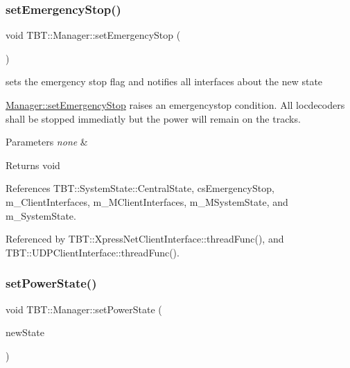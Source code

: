 \mbox{\label{classTBT_1_1Manager_a5f5fdba7ccae731f3f348b572fd0ed16_a5f5fdba7ccae731f3f348b572fd0ed16}} 
\subsubsection{\texorpdfstring{set\+Emergency\+Stop()}{setEmergencyStop()}}
{\footnotesize\ttfamily void T\+B\+T\+::\+Manager\+::set\+Emergency\+Stop (\begin{DoxyParamCaption}{ }\end{DoxyParamCaption})}



sets the emergency stop flag and notifies all interfaces about the new state 

\hyperlink{classTBT_1_1Manager_a5f5fdba7ccae731f3f348b572fd0ed16_a5f5fdba7ccae731f3f348b572fd0ed16}{Manager\+::set\+Emergency\+Stop} raises an emergencystop condition. All locdecoders shall be stopped immediatly but the power will remain on the tracks.


\begin{DoxyParams}{Parameters}
{\em none} & \\
\hline
\end{DoxyParams}
\begin{DoxyReturn}{Returns}
void 
\end{DoxyReturn}


References T\+B\+T\+::\+System\+State\+::\+Central\+State, cs\+Emergency\+Stop, m\+\_\+\+Client\+Interfaces, m\+\_\+\+M\+Client\+Interfaces, m\+\_\+\+M\+System\+State, and m\+\_\+\+System\+State.



Referenced by T\+B\+T\+::\+Xpress\+Net\+Client\+Interface\+::thread\+Func(), and T\+B\+T\+::\+U\+D\+P\+Client\+Interface\+::thread\+Func().

\mbox{\label{classTBT_1_1Manager_a6e7616a839a1b48d89355bc740ed7793_a6e7616a839a1b48d89355bc740ed7793}} 
\subsubsection{\texorpdfstring{set\+Power\+State()}{setPowerState()}}
{\footnotesize\ttfamily void T\+B\+T\+::\+Manager\+::set\+Power\+State (\begin{DoxyParamCaption}\item[{\hyperlink{namespaceTBT_a05cc33b74a68fb6eaf5962b5979716d4_a05cc33b74a68fb6eaf5962b5979716d4}{Power\+State}}]{new\+State }\end{DoxyParamCaption})}




